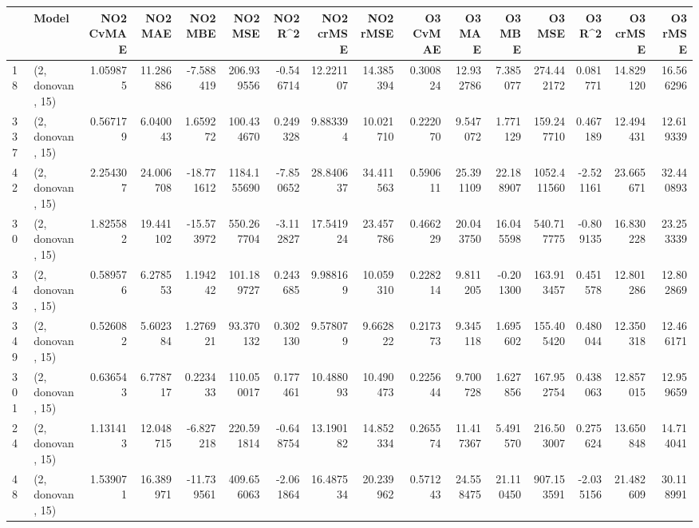 \begin{tabular}{llrrrrrrrrrrrrrr}
\toprule
{} &             Model &  NO2 CvMAE &    NO2 MAE &    NO2 MBE &      NO2 MSE &    NO2 R\textasciicircum2 &  NO2 crMSE &   NO2 rMSE &  O3 CvMAE &     O3 MAE &     O3 MBE &       O3 MSE &    O3 R\textasciicircum2 &   O3 crMSE &    O3 rMSE \\
\midrule
18  &  (2, donovan, 15) &   1.059875 &  11.286886 &  -7.588419 &   206.939556 &  -0.546714 &  12.221107 &  14.385394 &  0.300824 &  12.932786 &   7.385077 &   274.442172 &  0.081771 &  14.829120 &  16.566296 \\
337 &  (2, donovan, 15) &   0.567179 &   6.040043 &   1.659272 &   100.434670 &   0.249328 &   9.883394 &  10.021710 &  0.222070 &   9.547072 &   1.771129 &   159.247710 &  0.467189 &  12.494431 &  12.619339 \\
42  &  (2, donovan, 15) &   2.254307 &  24.006708 & -18.771612 &  1184.155690 &  -7.850652 &  28.840637 &  34.411563 &  0.590611 &  25.391109 &  22.188907 &  1052.411560 & -2.521161 &  23.665671 &  32.440893 \\
30  &  (2, donovan, 15) &   1.825582 &  19.441102 & -15.573972 &   550.267704 &  -3.112827 &  17.541924 &  23.457786 &  0.466229 &  20.043750 &  16.045598 &   540.717775 & -0.809135 &  16.830228 &  23.253339 \\
343 &  (2, donovan, 15) &   0.589576 &   6.278553 &   1.194242 &   101.189727 &   0.243685 &   9.988169 &  10.059310 &  0.228214 &   9.811205 &  -0.201300 &   163.913457 &  0.451578 &  12.801286 &  12.802869 \\
349 &  (2, donovan, 15) &   0.526082 &   5.602384 &   1.276921 &    93.370132 &   0.302130 &   9.578079 &   9.662822 &  0.217373 &   9.345118 &   1.695602 &   155.405420 &  0.480044 &  12.350318 &  12.466171 \\
301 &  (2, donovan, 15) &   0.636543 &   6.778717 &   0.223433 &   110.050017 &   0.177461 &  10.488093 &  10.490473 &  0.225644 &   9.700728 &   1.627856 &   167.952754 &  0.438063 &  12.857015 &  12.959659 \\
24  &  (2, donovan, 15) &   1.131413 &  12.048715 &  -6.827218 &   220.591814 &  -0.648754 &  13.190182 &  14.852334 &  0.265574 &  11.417367 &   5.491570 &   216.503007 &  0.275624 &  13.650848 &  14.714041 \\
48  &  (2, donovan, 15) &   1.539071 &  16.389971 & -11.739561 &   409.656063 &  -2.061864 &  16.487534 &  20.239962 &  0.571243 &  24.558475 &  21.110450 &   907.153591 & -2.035156 &  21.482609 &  30.118991 \\

\end{tabular}
